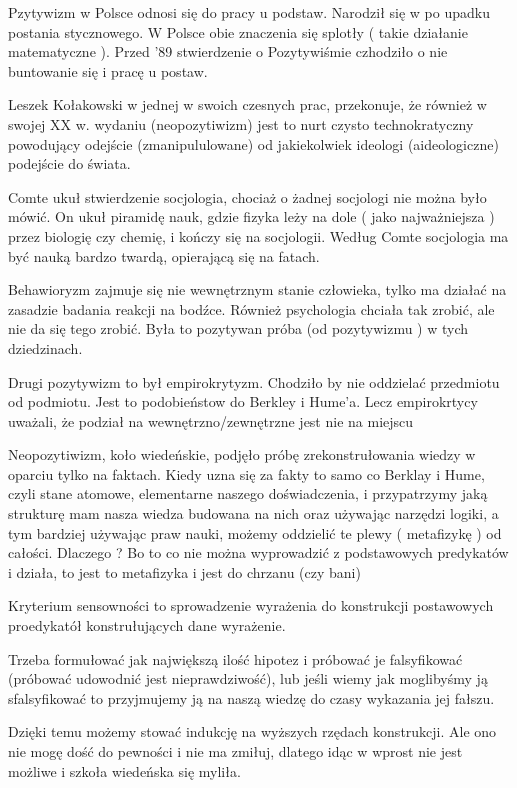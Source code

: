 \documentclass[11pt]{article}
\begin{document}
Pzytywizm w Polsce odnosi się do pracy u podstaw. Narodził się w po upadku postania stycznowego. W Polsce obie znaczenia się splotły ( takie działanie matematyczne ). Przed '89 stwierdzenie o Pozytywiśmie czhodziło o nie buntowanie się i pracę u postaw.

Leszek Kołakowski w jednej w swoich czesnych prac, przekonuje, że również w swojej XX w. wydaniu (neopozytiwizm) jest to nurt  czysto technokratyczny powodujący odejście (zmanipululowane) od jakiekolwiek ideologi (aideologiczne) podejście do świata.

Comte ukuł stwierdzenie socjologia, chociaż o żadnej socjologi nie można było mówić. On ukuł piramidę nauk, gdzie fizyka leży na dole ( jako najważniejsza ) przez biologię czy chemię, i kończy się na socjologii. Według Comte socjologia ma być nauką bardzo twardą, opierającą się na fatach.

Behawioryzm zajmuje się nie wewnętrznym stanie człowieka, tylko ma działać na zasadzie badania reakcji na bodźce. Również psychologia chciała tak zrobić, ale nie da się tego zrobić. Była to pozytywan próba (od pozytywizmu ) w tych dziedzinach.

Drugi pozytywizm to był empirokrytyzm. Chodziło by nie oddzielać przedmiotu od podmiotu. Jest to podobieństow do Berkley i Hume'a. Lecz empirokrtycy uważali, że podział na wewnętrzno/zewnętrzne jest nie na miejscu

Neopozytiwizm, koło wiedeńskie, podjęło próbę zrekonstrułowania wiedzy w oparciu tylko na faktach. Kiedy uzna się za fakty to samo co Berklay i Hume, czyli stane atomowe, elementarne naszego doświadczenia, i przypatrzymy jaką strukturę mam nasza wiedza budowana na nich oraz używając narzędzi logiki, a tym bardziej używając praw nauki, możemy oddzielić te plewy ( metafizykę ) od całości. Dlaczego ? Bo to co nie można wyprowadzić z podstawowych predykatów i działa, to jest to metafizyka i jest do chrzanu (czy bani) 

Kryterium sensowności to sprowadzenie wyrażenia do konstrukcji postawowych proedykatół konstrułujących dane wyrażenie. 

Trzeba formułować jak największą ilość hipotez i próbować je falsyfikować (próbować udowodnić jest nieprawdziwość), lub jeśli wiemy jak moglibyśmy ją sfalsyfikować to przyjmujemy ją na naszą wiedzę do czasy wykazania jej fałszu. 

Dzięki temu możemy stować indukcję na wyższych rzędach konstrukcji. Ale ono nie mogę dość do pewności i nie ma zmiłuj, dlatego idąc w wprost nie jest możliwe i szkoła wiedeńska się myliła.
\end{document}
